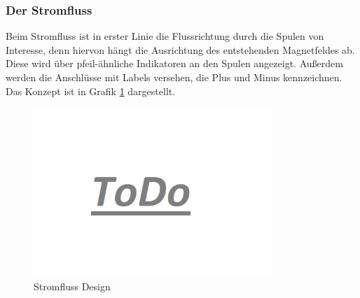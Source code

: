 \subsubsection{Der Stromfluss} 
\label{sec-4-2-3}
Beim Stromfluss ist in erster Linie die Flussrichtung durch die Spulen von Interesse, denn hiervon hängt die Ausrichtung des entstehenden Magnetfeldes ab. Diese wird über pfeil-ähnliche Indikatoren an den Spulen angezeigt. Außerdem werden die Anschlüsse mit Labels versehen, die Plus und Minus kennzeichnen. Das Konzept ist in Grafik \ref{img:current-design} dargestellt.

\begin{figure}[h!]
	\centering
	\includegraphics[width=0.8\textwidth]{images/todo.jpg}
	\caption{Stromfluss Design}
	\label{img:current-design}
\end{figure}


\vspace{8px}
\begin{center}
	\\
\end{center}
\vspace{6px}

